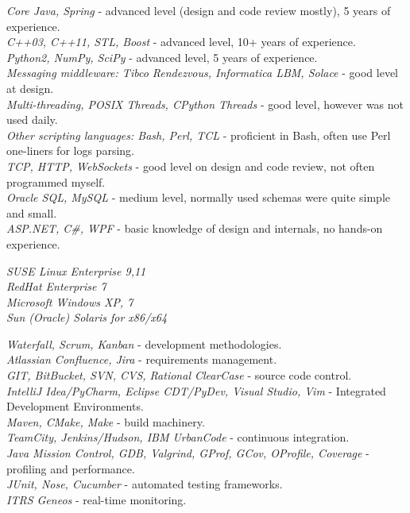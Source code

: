 \documentclass[10pt]{article} %
\begin{document}
{
\textit{Core Java, Spring} - advanced level (design and code review mostly), 5 years of experience.\\
\textit{C++03, C++11, STL, Boost} - advanced level, 10+ years of experience.\\
\textit{Python2, NumPy, SciPy} - advanced level, 5 years of experience.\\
\textit{Messaging middleware: Tibco Rendezvous, Informatica LBM, Solace} - good level at design.\\
\textit{Multi-threading, POSIX Threads, CPython Threads} - good level, however was not used daily.\\
\textit{Other scripting languages: Bash, Perl, TCL} -  proficient in Bash, often use Perl one-liners for logs parsing.\\
\textit{TCP, HTTP, WebSockets} - good level on design and code review, not often programmed myself.\\
\textit{Oracle SQL, MySQL} - medium level, normally used schemas were quite simple and small.\\
\textit{ASP.NET, C\#, WPF} - basic knowledge of design and internals, no hands-on experience.\\
}


{
\textit{SUSE Linux Enterprise 9,11}\\
\textit{RedHat Enterprise 7}\\
\textit{Microsoft Windows XP, 7}\\
\textit{Sun (Oracle) Solaris for x86/x64}
}


\clearpage

{
\textit{Waterfall, Scrum, Kanban} - development methodologies.\\
\textit{Atlassian Confluence, Jira} - requirements management.\\
\textit{GIT, BitBucket, SVN, CVS, Rational ClearCase} - source code control.\\
\textit{IntelliJ Idea/PyCharm, Eclipse CDT/PyDev, Visual Studio, Vim} - Integrated Development Environments.\\
\textit{Maven, CMake, Make} - build machinery.\\
\textit{TeamCity, Jenkins/Hudson, IBM UrbanCode} - continuous integration.\\
\textit{Java Mission Control, GDB, Valgrind, GProf, GCov, OProfile, Coverage} - profiling and performance.\\ 
\textit{JUnit, Nose, Cucumber} - automated testing frameworks.\\
\textit{ITRS Geneos} - real-time monitoring.\\
}
\end{document}
